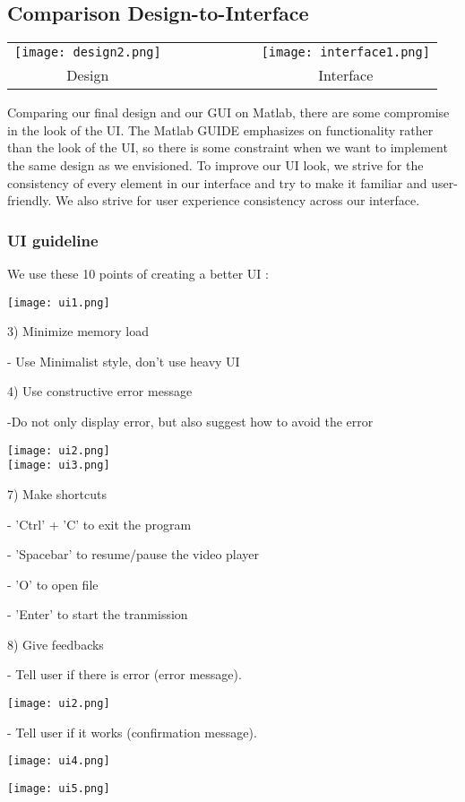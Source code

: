 \documentclass[12pt,a4paper]{article}
\begin{document}
\subsection{Comparison Design-to-Interface}
\begin{center}
\begin{tabular}{c r r r | r r r c}
\texttt{[image: design2.png]}&&&&&&&\texttt{[image: interface1.png]}\\
Design&&&&&&&Interface\\
\end{tabular}
\end{center}
\par \vspace{0.25cm}Comparing our final design and our GUI on Matlab, there are some compromise in the look of the UI. The Matlab GUIDE emphasizes on functionality rather than the look of the UI, so there is some constraint when we want to implement the same design as we envisioned. To improve our UI look, we strive for the consistency of every element in our interface and try to make it familiar and user-friendly. We also strive for user experience consistency across our interface.  


\subsubsection{UI guideline}
We use these 10 points of creating a better UI :
\begin{center}
\texttt{[image: ui1.png]}\\
\end{center}

\par  \vspace{0.25cm} 3) Minimize memory load
\par - Use Minimalist style, don’t use heavy UI

\par  \vspace{0.25cm} 4) Use constructive error message
\par -Do not only display error, but also suggest how to avoid the error
\par \texttt{[image: ui2.png]}\\
\texttt{[image: ui3.png]}

\par  \vspace{0.25cm} 7) Make shortcuts
\par - 'Ctrl' + 'C' to exit the program
\par - 'Spacebar' to resume/pause the video player
\par - 'O' to open file 
\par - 'Enter' to start the tranmission 

\par  \vspace{0.25cm} 8) Give feedbacks
\par - Tell user if there is error (error message).
\par \texttt{[image: ui2.png]}
\par - Tell user if it works (confirmation message). 
\par \texttt{[image: ui4.png]}
\begin{center}
\texttt{[image: ui5.png]}\\
\end{center}
\end{document}
